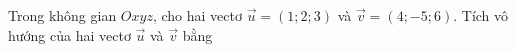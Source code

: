 \begin{ex}
Trong không gian $Oxyz$, cho hai vectơ $\vec{u}=(1;2;3)$ và $\vec{v}=(4;-5;6)$. Tích vô hướng của hai vectơ $\vec{u}$ và $\vec{v}$ bằng
\end{ex}

